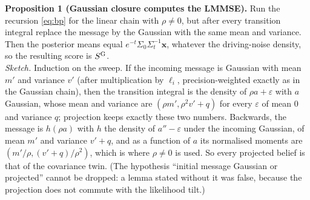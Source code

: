 \textbf{Proposition 1 (Gaussian closure computes the LMMSE).} Run the recursion \eqref{eq:bp} for the linear chain with $\rho\ne0$, but after every transition integral replace the message by the Gaussian with the same mean and variance. Then the posterior
means equal $e^{-t}\Sigma_0\Sigma_t^{-1}\mathbf x$, whatever the driving-noise density, so the resulting score is $S^{\rm G}$.\\
\emph{Sketch.} Induction on the sweep. If the incoming message is Gaussian with mean $m'$ and variance $v'$ (after multiplication by $\ell_i$, precision-weighted exactly as in the Gaussian chain), then the transition integral is the
density of $\rho a+\varepsilon$ with $a$ Gaussian, whose mean and variance are $(\rho m',\rho^2v'+q)$ for every $\varepsilon$ of mean 0 and variance $q$; projection keeps exactly these two numbers. Backwards, the message is
$h(\rho a)$ with $h$ the density of $a''-\varepsilon$ under the incoming Gaussian, of mean $m'$ and variance $v'+q$, and as a function of $a$ its normalised moments are $(m'/\rho,(v'+q)/\rho^2)$, which is where $\rho\ne0$ is used.
So every projected belief is that of the covariance twin. (The hypothesis ``initial message Gaussian or projected'' cannot be dropped: a lemma stated without it was false, because the projection does not commute with the likelihood tilt.)

